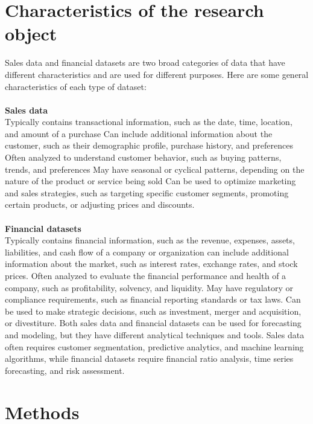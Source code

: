     \section{Characteristics of the research object} \label{subsec:research_object}
    Sales data and financial datasets are two broad categories of data that have different characteristics and are used
    for different purposes. Here are some general characteristics of each type of dataset:\\
    \\
    \textbf{Sales data}\\
    Typically contains transactional information, such as the date, time, location, and amount of a purchase
    Can include additional information about the customer, such as their demographic profile, purchase history, and
    preferences Often analyzed to understand customer behavior, such as buying patterns, trends, and preferences
    May have seasonal or cyclical patterns, depending on the nature of the product or service being sold
    Can be used to optimize marketing and sales strategies, such as targeting specific customer segments, promoting
    certain products, or adjusting prices and discounts.\\
    \\
    \textbf{Financial datasets}\\
    Typically contains financial information, such as the revenue, expenses, assets, liabilities, and cash
    flow of a company or organization can include additional information about the market, such as interest rates,
    exchange rates, and stock prices. Often analyzed to evaluate the financial performance and health of a company,
    such as profitability, solvency, and liquidity. May have regulatory or compliance requirements, such as financial
    reporting standards or tax laws. Can be used to make strategic decisions, such as investment, merger and
    acquisition, or divestiture. Both sales data and financial datasets can be used for forecasting and modeling,
    but they have different analytical techniques and tools. Sales data often requires customer segmentation,
    predictive analytics, and machine learning algorithms, while financial datasets require financial ratio analysis,
    time series forecasting, and risk assessment.
    \section{Methods} \label{subsec:methods}
